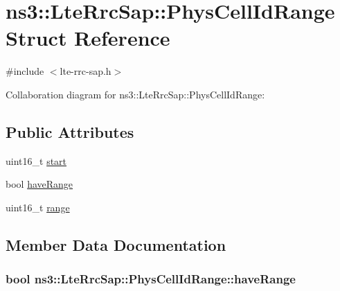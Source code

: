 \hypertarget{structns3_1_1LteRrcSap_1_1PhysCellIdRange}{}\section{ns3\+:\+:Lte\+Rrc\+Sap\+:\+:Phys\+Cell\+Id\+Range Struct Reference}
\label{structns3_1_1LteRrcSap_1_1PhysCellIdRange}


{\ttfamily \#include $<$lte-\/rrc-\/sap.\+h$>$}



Collaboration diagram for ns3\+:\+:Lte\+Rrc\+Sap\+:\+:Phys\+Cell\+Id\+Range\+:
\subsection*{Public Attributes}
\begin{DoxyCompactItemize}
\item 
uint16\+\_\+t \hyperlink{structns3_1_1LteRrcSap_1_1PhysCellIdRange_a6ff6aa3a8213e0c8f7a588d315223004}{start}
\item 
bool \hyperlink{structns3_1_1LteRrcSap_1_1PhysCellIdRange_a4fb580ce0898161f9fd1558834eb7990}{have\+Range}
\item 
uint16\+\_\+t \hyperlink{structns3_1_1LteRrcSap_1_1PhysCellIdRange_af87b98f145256e2f319eb510799ec185}{range}
\end{DoxyCompactItemize}


\subsection{Member Data Documentation}
\subsubsection[{\texorpdfstring{have\+Range}{haveRange}}]{\setlength{\rightskip}{0pt plus 5cm}bool ns3\+::\+Lte\+Rrc\+Sap\+::\+Phys\+Cell\+Id\+Range\+::have\+Range}\hypertarget{structns3_1_1LteRrcSap_1_1PhysCellIdRange_a4fb580ce0898161f9fd1558834eb7990}{}\label{structns3_1_1LteRrcSap_1_1PhysCellIdRange_a4fb580ce0898161f9fd1558834eb7990}
